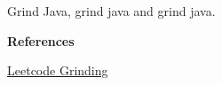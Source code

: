 

Grind Java, grind java and grind java.


\textbf{References}


\href{https://leetcode.com/discuss/career/216554/from-0-to-clearing-uberappleamazonlinkedingoogle}{Leetcode Grinding}